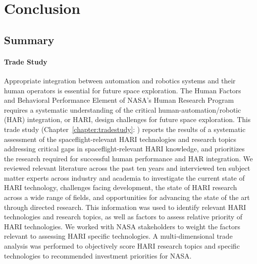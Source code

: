 \chapter{Conclusion}
\label{chap:conclusion}

\section{Summary}

\subsubsection{Trade Study}
Appropriate integration between automation and robotics systems and their human operators is essential for future space exploration.
The Human Factors and Behavioral Performance Element of NASA's Human Research Program requires a systematic understanding of the critical human-automation/robotic (HAR) integration, or HARI, design challenges for future space exploration.
This trade study (Chapter~\ref{chapter:tradestudy}: ) reports the results of a systematic assessment of the spaceflight-relevant HARI technologies and research topics addressing critical gaps in spaceflight-relevant HARI knowledge, and prioritizes the research required for successful human performance and HAR integration.
We reviewed relevant literature across the past ten years and interviewed ten subject matter experts across industry and academia to investigate the current state of HARI technology, challenges facing development, the state of HARI research across a wide range of fields, and opportunities for advancing the state of the art through directed research.
This information was used to identify relevant HARI technologies and research topics, as well as factors to assess relative priority of HARI technologies.
We worked with NASA stakeholders to weight the factors relevant to assessing HARI specific technologies.
A multi-dimensional trade analysis was performed to objectively score HARI research topics and specific technologies to recommended investment priorities for NASA.

